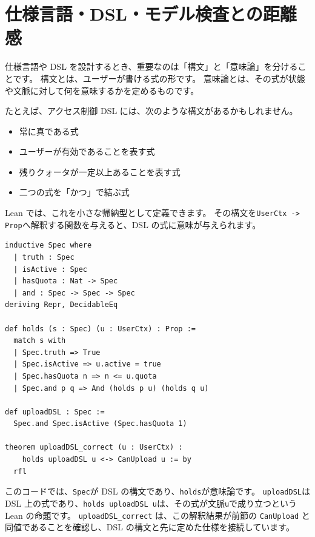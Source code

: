 \section{仕様言語・DSL・モデル検査との距離感}

仕様言語や DSL を設計するとき、重要なのは「構文」と「意味論」を分けることです。
構文とは、ユーザーが書ける式の形です。
意味論とは、その式が状態や文脈に対して何を意味するかを定めるものです。

たとえば、アクセス制御 DSL には、次のような構文があるかもしれません。

\begin{itemize}
  \item 常に真である式
  \item ユーザーが有効であることを表す式
  \item 残りクォータが一定以上あることを表す式
  \item 二つの式を「かつ」で結ぶ式
\end{itemize}

Lean では、これを小さな帰納型として定義できます。
その構文を\texttt{UserCtx -> Prop}へ解釈する関数を与えると、DSL の式に意味が与えられます。

\begin{listing}[htbp]
\begin{verbatim}
inductive Spec where
  | truth : Spec
  | isActive : Spec
  | hasQuota : Nat -> Spec
  | and : Spec -> Spec -> Spec
deriving Repr, DecidableEq

def holds (s : Spec) (u : UserCtx) : Prop :=
  match s with
  | Spec.truth => True
  | Spec.isActive => u.active = true
  | Spec.hasQuota n => n <= u.quota
  | Spec.and p q => And (holds p u) (holds q u)

def uploadDSL : Spec :=
  Spec.and Spec.isActive (Spec.hasQuota 1)

theorem uploadDSL_correct (u : UserCtx) :
    holds uploadDSL u <-> CanUpload u := by
  rfl
\end{verbatim}
\caption{\texttt{Spec}・\texttt{holds}・\texttt{uploadDSL\_correct}}
\label{lst:ch39_spec_dsl}
\end{listing}

このコードでは、\texttt{Spec}が DSL の構文であり、\texttt{holds}が意味論です。
\texttt{uploadDSL}は DSL 上の式であり、\texttt{holds uploadDSL u}は、その式が文脈\texttt{u}で成り立つという Lean の命題です。
\texttt{uploadDSL\_correct} は、この解釈結果が前節の \texttt{CanUpload} と同値であることを確認し、DSL の構文と先に定めた仕様を接続しています。

